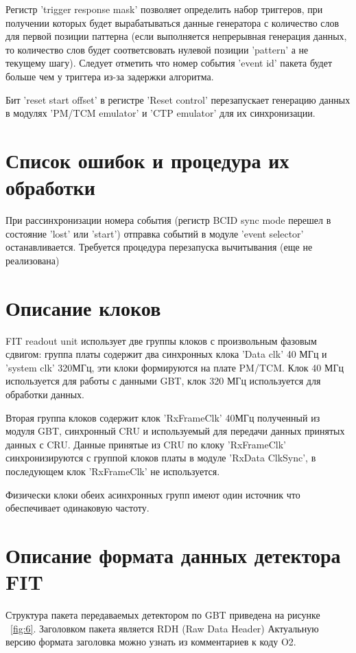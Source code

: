 \documentclass{article}
\begin{document}
Регистр 'trigger response mask' позволяет определить набор триггеров, при получении которых будет вырабатываться данные генератора с количество слов для первой позиции паттерна (если выполняется непрерывная генерация данных, то количество слов будет соответсвовать нулевой позиции 'pattern' а не текущему шагу). Следует отметить что номер события 'event id' пакета будет больше чем у триггера из-за задержки алгоритма. 

Бит 'reset start offset' в регистре 'Reset control' перезапускает генерацию данных в модулях 'PM/TCM emulator' и 'CTP emulator' для их синхронизации.




\section{Список ошибок и процедура их обработки}
При рассинхронизации номера события (регистр BCID sync mode перешел в состояние 'lost' или 'start') отправка событий в модуле 'event selector' останавливается.
Требуется процедура перезапуска вычитывания (еще не реализована)




\section{Описание клоков}
FIT readout unit использует две группы клоков с   произвольным  фазовым сдвигом: группа платы содержит два синхронных клока 'Data clk' 40 МГц и 'system clk' 320МГц, эти клоки  формируются на плате PM/TCM. Клок 40 МГц используется для работы с данными GBT, клок 320 МГц используется для обработки данных. 

Вторая группа клоков содержит клок 'RxFrameClk' 40МГц полученный из модуля GBT, синхронный CRU и используемый для передачи данных принятых данных с CRU. Данные принятые из CRU по клоку 'RxFrameClk' синхронизируются с группой клоков платы в модуле 'RxData ClkSync', в последующем клок 'RxFrameClk' не используется.

Физически клоки обеих асинхронных групп имеют один источник что обеспечивает одинаковую частоту.


\section{Описание формата данных детектора FIT}
Структура пакета передаваемых детектором по GBT приведена на рисунке  ~\ref{fig:6}. Заголовком пакета является  RDH (Raw Data Header) Актуальную версию формата заголовка можно узнать из комментариев к коду O2.
\end{document}
